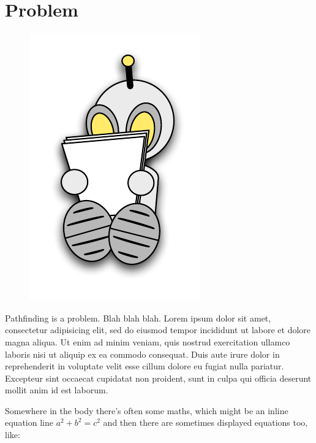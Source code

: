 \section{Problem}
 \begin{figure}
\vspace{-5.5em}
		\includegraphics[width=0.2\columnwidth]{diagrams/robot_reading.pdf}
 \end{figure}
Pathfinding is a problem. Blah blah blah.
Lorem ipsum dolor sit amet, consectetur adipisicing elit, sed do eiusmod
tempor incididunt ut labore et dolore magna aliqua. Ut enim ad minim
veniam, quis nostrud exercitation ullamco laboris nisi ut aliquip ex ea
commodo consequat. Duis aute irure dolor in reprehenderit in voluptate
velit esse cillum dolore eu fugiat nulla pariatur. Excepteur sint occaecat
cupidatat non proident, sunt in culpa qui officia deserunt mollit anim
id est laborum.

Somewhere in the body there's often some maths, which might be an inline equation
line $a^2+b^2=c^2$ and then there are sometimes displayed equations too, like:
\vspace{2em}
 \begin{figure}[h]
	\centering
 \end{figure}
